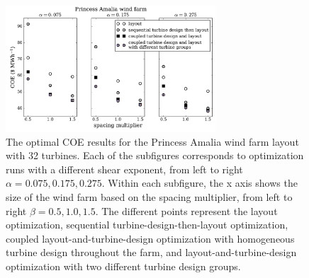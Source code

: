 \documentclass[wes, manuscript]{copernicus}
\begin{document}


\begin{figure}[htbp]
  \centering
  \includegraphics[width=0.7\textwidth]{Figures/amalia_results1.pdf}
  \caption{\label{amalia_results} The optimal COE results for the Princess Amalia wind farm layout with 32 turbines. Each of the subfigures corresponds to optimization runs with a different shear exponent, from left to right $\alpha=0.075,0.175,0.275$. Within each subfigure, the x axis shows the size of the wind farm based on the spacing multiplier, from left to right $\beta=0.5,1.0,1.5$. The different points represent the layout optimization, sequential turbine-design-then-layout optimization, coupled layout-and-turbine-design optimization with homogeneous turbine design throughout the farm, and layout-and-turbine-design optimization with two different turbine design groups.}
\end{figure}
\end{document}
